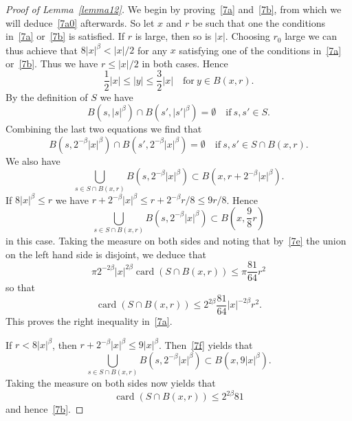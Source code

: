 \documentclass[12pt,a4paper]{amsart}
\theoremstyle{plain}
\theoremstyle{definition}
\theoremstyle{remark}
\def\card{\operatorname{card}}
\numberwithin{equation}{section}
\begin{document}
\begin{proof}[Proof of Lemma~\ref{lemma12}] 
We begin by proving~\eqref{7a} and~\eqref{7b}, from which we will deduce~\eqref{7a0}
afterwards.
So let $x$ and $r$ be such that one the conditions in~\eqref{7a} or~\eqref{7b} is satisfied.
If $r$ is large, then so is $|x|$. 
Choosing $r_0$ large we can thus achieve  that $8|x|^\beta<|x|/2$ for any $x$ 
satisfying one of the conditions in~\eqref{7a} or~\eqref{7b}.
Thus we have $r\leq |x|/2$ in both cases. Hence
\begin{equation}\label{7d}
\frac12 |x|\leq |y|\leq \frac32 |x|
\quad\text{for}\ y\in B(x,r).
\end{equation}
By the definition of $S$ we have 
\begin{equation}\label{7c}
B(s,|s|^\beta)\cap B(s',|s'|^\beta)=\emptyset 
\quad\text{if}\ s,s'\in S.
\end{equation}
Combining the last two equations we find that 
\begin{equation}\label{7e}
B(s,2^{-\beta}|x|^\beta)\cap B(s',2^{-\beta}|x|^\beta)=\emptyset 
\quad\text{if}\ s,s'\in S\cap B(x,r).
\end{equation}
We also have 
\begin{equation}\label{7f}
\bigcup_{s\in S\cap B(x,r)} B(s,2^{-\beta}|x|^\beta)
\subset  B(x,r+2^{-\beta}|x|^\beta) .
\end{equation}
If $8|x|^\beta\leq r$ we have $r+2^{-\beta}|x|^\beta\leq r+2^{-\beta}r/8\leq 9r/8$.
Hence 
\begin{equation}\label{7f1}
\bigcup_{s\in S\cap B(x,r)} B(s,2^{-\beta}|x|^\beta)
\subset B\!\left(x,\frac98 r \right)
\end{equation}
in this case.
Taking the measure on both sides and noting that by~\eqref{7e} the union on the left
hand side is disjoint, we deduce that 
\begin{equation}\label{7g}
\pi 2^{-2\beta}|x|^{2\beta} \card(S\cap B(x,r))
\leq \pi \frac{81}{64}r^2
\end{equation}
so that
\begin{equation}\label{7h}
\card(S\cap B(x,r)) \leq 2^{2\beta}\frac{81}{64}|x|^{-2\beta} r^2 .
\end{equation}
This proves the right inequality in~\eqref{7a}.

If $r< 8|x|^\beta$, then $r+2^{-\beta}|x|^\beta\leq 9|x|^\beta$.
Then~\eqref{7f} yields that 
\begin{equation}\label{7i}
\bigcup_{s\in S\cap B(x,r)} B(s,2^{-\beta}|x|^\beta)
\subset B\!\left(x,9 |x|^\beta \right) .
\end{equation}
Taking the measure on both sides now yields that 
\begin{equation}\label{7j}
 \card(S\cap B(x,r))\leq 2^{2\beta} 81
\end{equation}
and hence~\eqref{7b}.


\end{proof}
\end{document}
